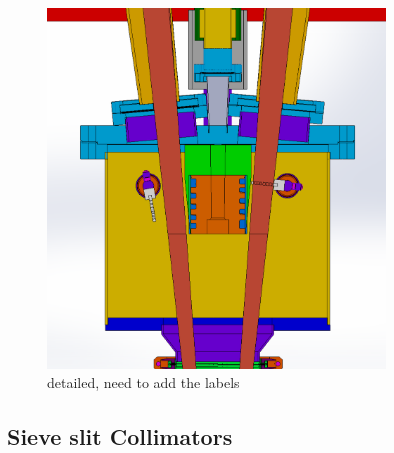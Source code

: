 \begin{figure}[!htbp]
    \centering
    \includegraphics[width=0.8\textwidth]{images/chap3/hrs_pivot_detailed.png}
    \caption{detailed, need to add the labels}
    \label{fig:enter-label}
\end{figure}

\subsection{Sieve slit Collimators}

